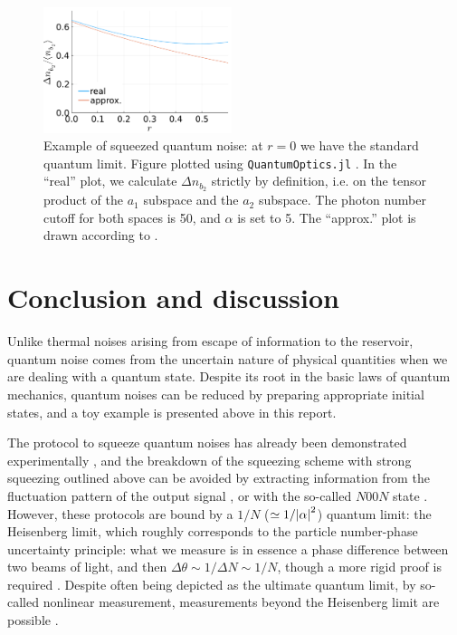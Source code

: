 \documentclass[hyperref, a4paper]{article}
\begin{document}
\begin{figure}
    \centering
    \includegraphics[width=0.49\textwidth]{plots/squeezing-error-measure-cutoff-50-phi-pi-10-alpha-5.pdf}
    \caption{Example of squeezed quantum noise: at $r = 0$ we have the standard quantum limit.
    Figure plotted using \texttt{QuantumOptics.jl} \cite{kramer2018quantumoptics}.
    In the ``real'' plot, 
    we calculate $\Delta n_{b_2}$ strictly by definition, 
    i.e. on the tensor product of the $a_1$ subspace and the $a_2$ subspace.
    The photon number cutoff for both spaces is 50,
    and $\alpha$ is set to 5.
    The ``approx.'' plot is drawn according to .
    }
    \label{fig:squeezing}
\end{figure}

\section{Conclusion and discussion}

Unlike thermal noises arising from escape of information to the reservoir, 
quantum noise comes from the uncertain nature of physical quantities 
when we are dealing with a quantum state.
Despite its root in the basic laws of quantum mechanics,
quantum noises can be reduced by preparing appropriate initial states,
and a toy example is presented above in this report.

The protocol to squeeze quantum noises 
has already been demonstrated experimentally \cite{xiao_precision_1987},
and the breakdown of the squeezing scheme with strong squeezing outlined above 
can be avoided by extracting information from the fluctuation pattern of the output signal 
\cite{pezze_mach-zehnder_2008},
or with the so-called $N00N$ state \cite{giovannetti_advances_2011}. 
However, these protocols are bound by a $1 / N$ ($\simeq 1 / \abs{\alpha}^2$) quantum limit: 
the Heisenberg limit,
which roughly corresponds to the particle number-phase uncertainty principle:
what we measure is in essence a phase difference 
between two beams of light,
and then $\Delta \theta \sim 1 / \Delta N \sim 1 / N$,
though a more rigid proof is required \cite{giovannetti_quantum_2006}.
Despite often being depicted as the ultimate quantum limit,
by so-called nonlinear measurement, measurements beyond the Heisenberg limit are possible 
\cite{boixo2008quantum,napolitano_interaction-based_2011}.
\end{document}
